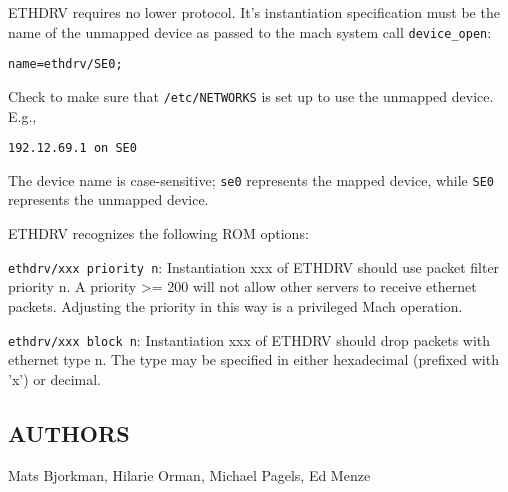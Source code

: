 ETHDRV requires no lower protocol.  It's instantiation specification
must be the name of the unmapped device as passed to the mach system call
{\tt device\_open}:

{\tt name=ethdrv/SE0;}

\noindent
Check to make sure that {\tt /etc/NETWORKS} is set up to use the
unmapped device.  E.g.,

{\tt 192.12.69.1 on SE0 }

\noindent
The device name is case-sensitive; {\tt se0} represents the mapped device,
while {\tt SE0} represents the unmapped device.

\medskip

\noindent
ETHDRV recognizes the following ROM options:

\smallskip

{\tt ethdrv/xxx priority n}:
Instantiation xxx of ETHDRV should use packet filter priority n.  
A priority >= 200 will not allow other servers to receive ethernet
packets.   Adjusting the priority in this way is a privileged
Mach operation. 

{\tt ethdrv/xxx block n}:
Instantiation xxx of ETHDRV should drop packets with ethernet type
n.  The type may be specified in either hexadecimal (prefixed with
'x') or decimal.


\subsection*{AUTHORS}

\noindent Mats Bjorkman, Hilarie Orman, Michael Pagels, Ed Menze

